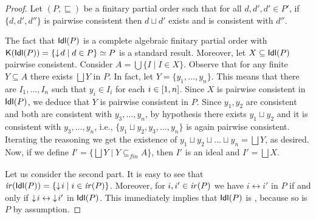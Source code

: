 \begin{proof}
  Let $(P,\sqsubseteq)$ be a 
  finitary partial order such that for all $d, d', d' \in P'$,
  if $\{ d, d', d''\}$ is pairwise consistent then
  $d \sqcup d'$ exists and is consistent with $d''$.

  The fact that $\mathsf{Idl}({P})$ is a
  complete algebraic finitary
  partial order with
  $\mathop{\mathsf{K}({\mathsf{Idl}({P})})} = \{ \mathop{\downarrow\!{d}} \mid d \in P \} \simeq P$ is
  a standard result. 
  Moreover, let $X \subseteq \mathsf{Idl}({P})$ pairwise consistent. Consider
  $A = \bigcup \{ I \mid I \in X\}$. Observe that for any finite
  $Y \subseteq A$ there exists $\bigsqcup Y$ in $P$. In fact, let
  $Y = \{ y_1, \ldots, y_n \}$. This means that there are
  $I_1, \ldots, I_n$ such that $y_i \in I_i$ for each
  $i \in [{1},{n}]$. Since $X$ is pairwise consistent in
  $\mathsf{Idl}({P})$, we deduce that $Y$ is pairwise consistent in $P$.
  Since $y_1, y_2$ are consistent and both are consistent with
  $y_3, \ldots, y_n$, by {hypothesis} there exists $y_1 \sqcup y_2$ and it is
  consistent with $y_3, \ldots, y_n$, i.e.,
  $\{ y_1 \sqcup y_2, y_3, \ldots, y_n \}$ is again pairwise
  consistent. Iterating the reasoning we get the existence of
  $y_1 \sqcup y_2 \sqcup \ldots \sqcup y_n = \bigsqcup Y$, as desired.
  Now, if we define
  $I' = \{ \bigsqcup Y \mid Y \subseteq_{\mathit{fin}} A \}$, then
  $I'$ is an ideal and $I' = \bigsqcup X$.

  \bigskip

  
  Let us consider the second part. It is easy to see that
  $\mathop{\mathit{ir}({\mathsf{Idl}({P})})} = \{ \mathop{\downarrow\!{i}} \mid i \in \mathop{\mathit{ir}({P})} \}$.
  Moreover, for $i, i' \in \mathop{\mathit{ir}({P})}$ we have $i \leftrightarrow i'$
  in $P$ if and only if 
  $\mathop{\downarrow\!{i}} \leftrightarrow \mathop{\downarrow\!{i'}}$ in $\mathsf{Idl}({P})$.
  This immediately implies that $\mathsf{Idl}({P})$ is {\wi}, because so is
  $P$ by assumption.


\end{proof}
